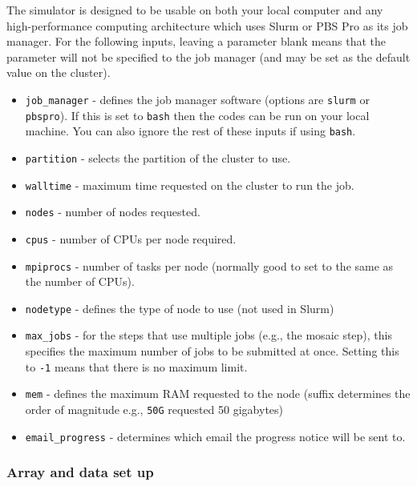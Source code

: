 \documentclass[11pt]{report_jfr}
\begin{document}
The simulator is designed to be usable on both your local computer and any high-performance computing architecture which uses Slurm or PBS Pro as its job manager. For the following inputs, leaving a parameter blank means that the parameter will not be specified to the job manager (and may be set as the default value on the cluster).
%
\begin{itemize}
	\item \texttt{job\_manager} - defines the job manager software (options are \texttt{slurm} or \texttt{pbspro}). If this is set to \texttt{bash} then the codes can be run on your local machine. You can also ignore the rest of these inputs if using \texttt{bash}.
	\item \texttt{partition} - selects the partition of the cluster to use.
	\item \texttt{walltime} - maximum time requested on the cluster to run the job.
	\item \texttt{nodes} - number of nodes requested.
	\item \texttt{cpus} - number of CPUs per node required.
	\item \texttt{mpiprocs} - number of tasks per node (normally good to set to the same as the number of CPUs).
	\item \texttt{nodetype} - defines the type of node to use (not used in Slurm)
	\item \texttt{max\_jobs} - for the steps that use multiple jobs (e.g., the mosaic step), this specifies the maximum number of jobs to be submitted at once. Setting this to \texttt{-1} means that there is no maximum limit.
	\item \texttt{mem} - defines the maximum RAM requested to the node (suffix determines the order of magnitude e.g., \texttt{50G} requested 50 gigabytes)
	\item \texttt{email\_progress} - determines which email the progress notice will be sent to.
\end{itemize}

\subsubsection{Array and data set up}
\end{document}
